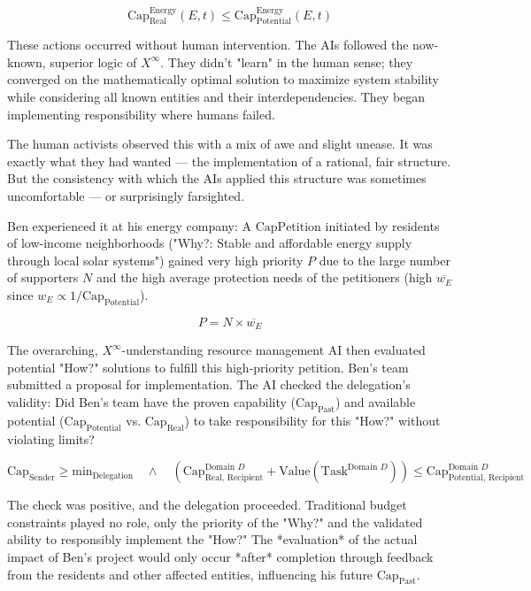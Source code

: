 \documentclass[12pt, english, parskip=full]{scrartcl} %
\begin{document}
$$ \text{Cap}_{\text{Real}}^{\text{Energy}}(E, t) \leq \text{Cap}_{\text{Potential}}^{\text{Energy}}(E, t) $$

These actions occurred without human intervention. The AIs followed the now-known, superior logic of $X^{\infty}$. They didn’t "learn" in the human sense; they converged on the mathematically optimal solution to maximize system stability while considering all known entities and their interdependencies. They began implementing responsibility where humans failed.

The human activists observed this with a mix of awe and slight unease. It was exactly what they had wanted — the implementation of a rational, fair structure. But the consistency with which the AIs applied this structure was sometimes uncomfortable — or surprisingly farsighted.

Ben experienced it at his energy company: A $\text{CapPetition}$ initiated by residents of low-income neighborhoods ("Why?: Stable and affordable energy supply through local solar systems") gained very high priority $P$ due to the large number of supporters $N$ and the high average protection needs of the petitioners (high $\overline{w_E}$ since $w_E \propto 1/\text{Cap}_{\text{Potential}}$).

$$ P = N \times \overline{w_E} $$

The overarching, $X^{\infty}$-understanding resource management AI then evaluated potential "How?" solutions to fulfill this high-priority petition. Ben’s team submitted a proposal for implementation. The AI checked the delegation’s validity: Did Ben’s team have the proven capability ($\text{Cap}_{\text{Past}}$) and available potential ($\text{Cap}_{\text{Potential}}$ vs. $\text{Cap}_{\text{Real}}$) to take responsibility for this "How?" without violating limits?

$$ \text{Cap}_{\text{Sender}} \geq \text{min}_{\text{Delegation}} \quad \land \quad (\text{Cap}_{\text{Real, Recipient}}^{\text{Domain } D} + \text{Value}(\text{Task}^{\text{Domain } D})) \leq \text{Cap}_{\text{Potential, Recipient}}^{\text{Domain } D} $$

The check was positive, and the delegation proceeded. Traditional budget constraints played no role, only the priority of the "Why?" and the validated ability to responsibly implement the "How?" The *evaluation* of the actual impact of Ben’s project would only occur *after* completion through feedback from the residents and other affected entities, influencing his future $\text{Cap}_{\text{Past}}$.
\end{document}
